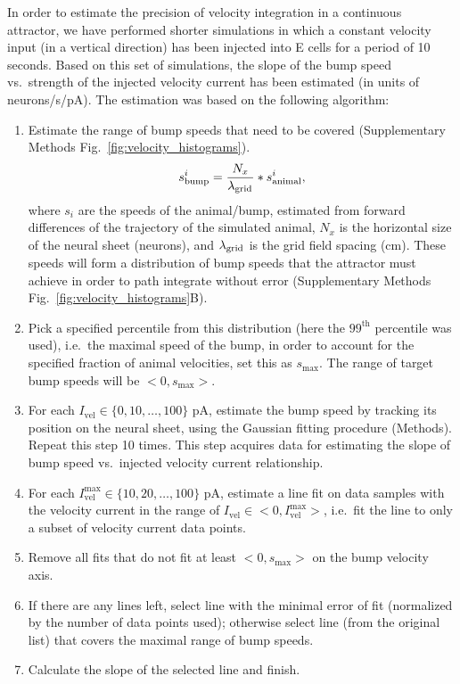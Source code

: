 \documentclass[a4paper,12pt]{article}
\newcommand{\ssc}[3]{\ensuremath{#1_{\text{#2}_{\text{#3}}}}}
\newcommand{\lamgrid}{\ssc{\lambda}{\scriptsize{grid}}{}}
\begin{document}
In order to estimate the precision of velocity integration in a continuous
attractor, we have performed shorter simulations in which a constant velocity
input (in a vertical direction) has been injected into E cells for a period of 10
seconds. Based on this set of simulations, the slope of the bump speed vs.\ 
strength of the injected velocity current has been estimated (in units of
neurons/s/pA).  The estimation was based on the following algorithm:
\begin{enumerate}
    \item Estimate the range of bump speeds that need to be covered
        (Supplementary Methods Fig.~\ref{fig:velocity_histograms}).
        \begin{equation}
        s_{\text{bump}}^i =
        \frac{N_x}{\lamgrid}*s_{\text{animal}}^i,
        \label{eq:bump_speeds}
        \end{equation}
        where $s_{i}$ are the speeds of the animal/bump, estimated from forward
        differences of the trajectory of the simulated animal, $N_x$ is the
        horizontal size of the neural sheet (neurons), and $\lamgrid$ is the grid
        field spacing (cm).  These speeds will form a distribution of bump
        speeds that the attractor must achieve in order to path integrate
        without error (Supplementary Methods Fig.~\ref{fig:velocity_histograms}B).
    \item Pick a specified percentile from this distribution (here the
        $99^\text{th}$ percentile was used), i.e.\ the maximal speed of the
        bump, in order to account for the specified fraction of animal
        velocities, set this as $s_{\text{max}}$. The range of target bump
        speeds will be $<0, s_{\text{max}}>$.
    \item For each $I_{\text{vel}} \in \{0, 10, \dots, 100\}$ pA, estimate the
        bump speed by tracking its position on the neural sheet, using the
        Gaussian fitting procedure (Methods). Repeat this step 10 times. This
        step acquires data for estimating the slope of bump speed vs.\ injected
        velocity
        current relationship.
    \item For each $I_{\text{vel}}^{\text{max}} \in \{10, 20, \dots, 100\}$ pA,
        estimate a line fit on data samples with the velocity current in the
        range of $I_{\text{vel}} \in <0, I_{\text{vel}}^{\text{max}}>$, i.e.\ 
        fit the line to only a subset of velocity current data points.
    \item Remove all fits that do not fit at least $<0, s_{\text{max}}>$ on the
        bump velocity axis.
    \item If there are any lines left, select line with the minimal error
        of fit (normalized by the number of data points used); otherwise select
        line (from the original list) that covers the maximal range of bump
        speeds.
    \item Calculate the slope of the selected line and finish.
\end{enumerate}
\end{document}
